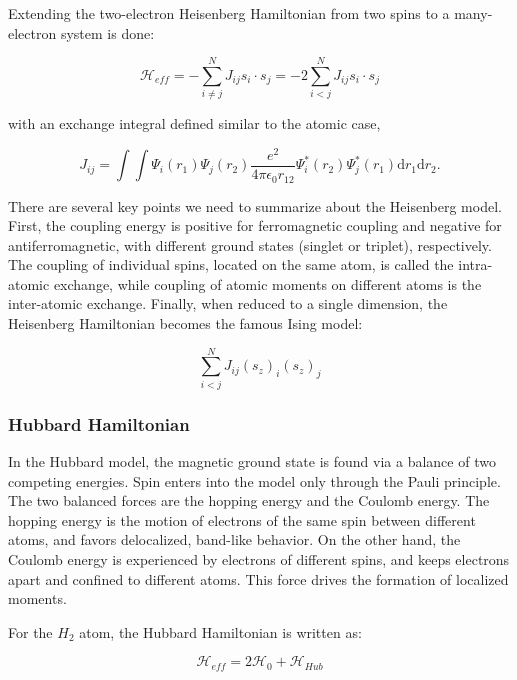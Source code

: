 Extending the two-electron Heisenberg Hamiltonian from two spins to a many-electron system is done:

\begin{equation}
\mathscr{H}_{eff}=-\sum_{i\neq j}^N J_{ij} s_i \cdot s_j = -2 \sum_{i<j}^N J_{ij} s_i \cdot s_j
\end{equation}

with an exchange integral defined similar to the atomic case,

\begin{equation}
J_{ij} = \int \int \Psi_i(r_1)\Psi_j(r_2)\frac{e^2}{4\pi\epsilon_0 r_{12}}\Psi_i^*(r_2)\Psi_j^*(r_1)\text{d}r_1\text{d}r_2.
\end{equation}

There are several key points we need to summarize about the Heisenberg model. First, the coupling energy is positive for ferromagnetic coupling and negative for antiferromagnetic, with different ground states (singlet or triplet), respectively. The coupling of individual spins, located on the same atom, is called the intra-atomic exchange, while coupling of atomic moments on different atoms is the inter-atomic exchange. Finally, when reduced to a single dimension, the Heisenberg Hamiltonian becomes the famous Ising model:

\begin{equation}
\sum^N_{i<j} J_{ij}(s_z)_i(s_z)_j
\end{equation}

\subsubsection{Hubbard Hamiltonian}

In the Hubbard model, the magnetic ground state is found via a balance of two competing energies. Spin enters into the model only through the Pauli principle. The two balanced forces are the hopping energy and the Coulomb energy. The hopping energy is the motion of electrons of the same spin between different atoms, and favors delocalized, band-like behavior. On the other hand, the Coulomb energy is experienced by electrons of different spins, and keeps electrons apart and confined to different atoms. This force drives the formation of localized moments.

For the $H_2$ atom, the Hubbard Hamiltonian is written as:

\begin{equation}
\mathscr{H}_{eff}=2\mathscr{H}_0+\mathscr{H}_{Hub}
\end{equation}

